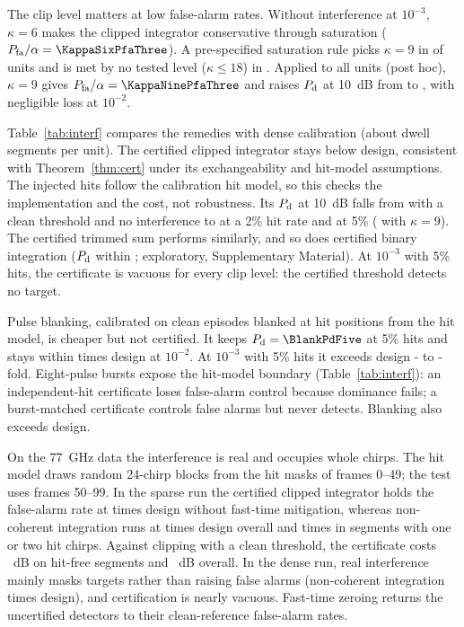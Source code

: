 \documentclass[journal]{IEEEtran}
\begin{document}
The clip level matters at low false-alarm rates. Without interference at $10^{-3}$, $\kappa=6$ makes the clipped integrator conservative through saturation ($P_{\rm fa}/\alpha=\KappaSixPfaThree$). A pre-specified saturation rule picks $\kappa=9$ in {\KappaNineUnits} of \NUnitsConf{} units and is met by no tested level ($\kappa\le18$) in \KappaRuleUndefUnits. Applied to all units (post hoc), $\kappa=9$ gives $P_{\rm fa}/\alpha=\KappaNinePfaThree$ and raises $P_{\rm d}$ at 10~dB from \KappaSixPdThree{} to \KappaNinePdThree, with negligible loss at $10^{-2}$.

Table~\ref{tab:interf} compares the remedies with dense calibration (about \DwellSegsPerUnit{} dwell segments per unit). The certified clipped integrator stays below design, consistent with Theorem~\ref{thm:cert} under its exchangeability and hit-model assumptions. The injected hits follow the calibration hit model, so this checks the implementation and the cost, not robustness. Its $P_{\rm d}$ at 10~dB falls from \CleanClipPdTen{} with a clean threshold and no interference to \CertSixPdTwo{} at a 2\% hit rate and \CertSixPdFive{} at 5\% (\CertNinePdFive{} with $\kappa=9$). The certified trimmed sum performs similarly, and so does certified binary integration ($P_{\rm d}$ within \BinCertGapMax; exploratory, Supplementary Material). At $10^{-3}$ with 5\% hits, the certificate is vacuous for every clip level: the certified threshold detects no target.

Pulse blanking, calibrated on clean episodes blanked at hit positions from the hit model, is cheaper but not certified. It keeps $P_{\rm d}=\BlankPdFive$ at 5\% hits and stays within \BlankPfaMax{} times design at $10^{-2}$. At $10^{-3}$ with 5\% hits it exceeds design \BlankFiveThreeMin- to \BlankFiveThreeMax-fold. Eight-pulse bursts expose the hit-model boundary (Table~\ref{tab:interf}): an independent-hit certificate loses false-alarm control because dominance fails; a burst-matched certificate controls false alarms but never detects. Blanking also exceeds design.

On the 77~GHz data the interference is real and occupies whole chirps. The hit model draws random 24-chirp blocks from the hit masks of frames 0--49; the test uses frames 50--99. In the sparse run the certified clipped integrator holds the false-alarm rate at \JCertPfaC{} times design without fast-time mitigation, whereas non-coherent integration runs at \JDinPfaC{} times design overall and \JDinPfaCone{} times in segments with one or two hit chirps. Against clipping with a clean threshold, the certificate costs \JCertCostClean~dB on hit-free segments and \JCertCostAll~dB overall. In the dense run, real interference mainly masks targets rather than raising false alarms (non-coherent integration \JDinPfaA{} times design), and certification is nearly vacuous. Fast-time zeroing returns the uncertified detectors to their clean-reference false-alarm rates.
\end{document}
